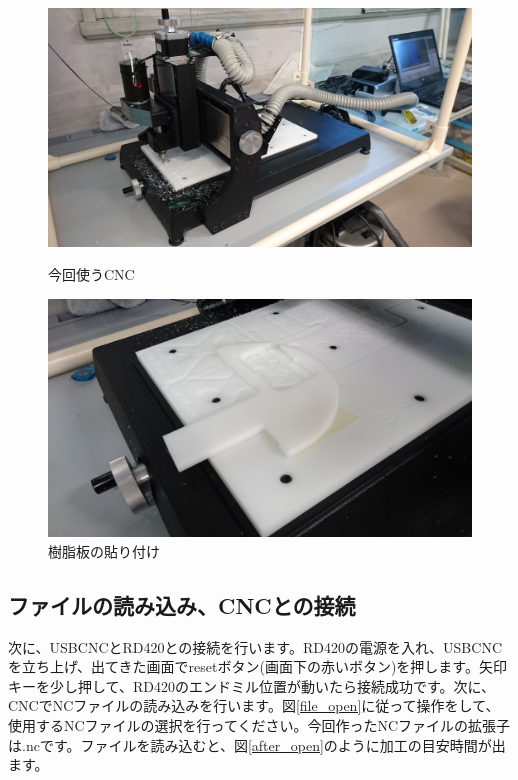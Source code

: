 \documentclass[b5paper, 9pt, twocolumn, titlepage,openany]{jsbook}%
\begin{document}
\begin{figure}[tbh]
  \begin{center}
    \begin{minipage}{1.0\columnwidth}
      \includegraphics[width=\columnwidth]{RD420.jpg}
    \end{minipage}
    \caption{今回使うCNC\label{RD420}}
    \begin{minipage}{1.0\columnwidth}
      \includegraphics[width=\columnwidth]{kotei.jpg}
    \end{minipage}
    \caption{樹脂板の貼り付け\label{kotei}}
  \end{center}
\end{figure}


\clearpage
\subsection{ファイルの読み込み、CNCとの接続}
次に、USBCNCとRD420との接続を行います。RD420の電源を入れ、USBCNCを立ち上げ、出てきた画面でresetボタン(画面下の赤いボタン)を押します。矢印キーを少し押して、RD420のエンドミル位置が動いたら接続成功です。次に、CNCでNCファイルの読み込みを行います。図\ref{file_open}に従って操作をして、使用するNCファイルの選択を行ってください。今回作ったNCファイルの拡張子は.ncです。ファイルを読み込むと、図\ref{after_open}のように加工の目安時間が出ます。\\
\end{document}
